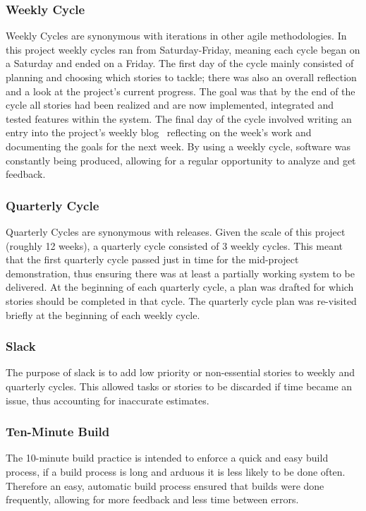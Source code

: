 \subsubsection{Weekly Cycle}
Weekly Cycles are synonymous with iterations in other agile methodologies. In this project weekly cycles ran from Saturday-Friday, meaning each cycle began on a Saturday and ended on a Friday. The first day of the cycle mainly consisted of planning and choosing which stories to tackle; there was also an overall reflection and a look at the project's current progress. The goal was that by the end of the cycle all stories had been realized and are now implemented, integrated and tested features within the system. The final day of the cycle involved writing an entry into the project's weekly blog~\cite{blog_ref} reflecting on the week's work and documenting the goals for the next week. By using a weekly cycle, software was constantly being produced, allowing for a regular opportunity to analyze and get feedback.

\subsubsection{Quarterly Cycle}
Quarterly Cycles are synonymous with releases. Given the scale of this project (roughly 12 weeks), a quarterly cycle consisted of 3 weekly cycles. This meant that the first quarterly cycle passed just in time for the mid-project demonstration, thus ensuring there was at least a partially working system to be delivered. At the beginning of each quarterly cycle, a plan was drafted for which stories should be completed in that cycle. The quarterly cycle plan was re-visited briefly at the beginning of each weekly cycle. 

\subsubsection{Slack}
The purpose of slack is to add low priority or non-essential stories to weekly and quarterly cycles. This allowed tasks or stories to be discarded if time became an issue, thus accounting for inaccurate estimates.

\subsubsection{Ten-Minute Build}
The 10-minute build practice is intended to enforce a quick and easy build process, if a build process is long and arduous it is less likely to be done often. Therefore an easy, automatic build process ensured that builds were done frequently, allowing for more feedback and less time between errors.

